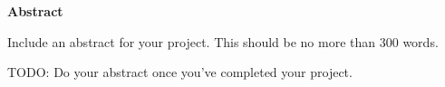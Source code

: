 \thispagestyle{empty}


\begin{center}
    {\LARGE\bf Abstract}
\end{center}

Include an abstract for your project. This should be no more than 300 words.

TODO: Do your abstract once you've completed your project.

